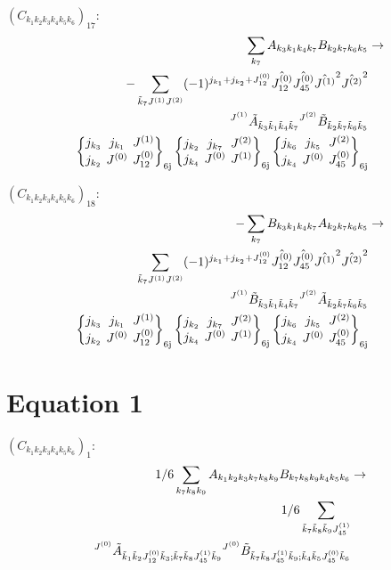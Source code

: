 \documentclass[11pt]{article}
\newcommand{\sixj}[6]{\begingroup\setlength{\arraycolsep}{0.2em}\begin{Bmatrix} #1 & #2 & #3 \\ #4 & #5 & #6 \end{Bmatrix}_{\text{6j}}\endgroup}
\begin{document}
$\left({C}_{{k}_{1}{k}_{2}{k}_{3}{k}_{4}{k}_{5}{k}_{6}}\right)_{17}$:
\begin{align}
\sum_{{k}_{7}}{A}_{{k}_{3}{k}_{1}{k}_{4}{k}_{7}}{B}_{{k}_{2}{k}_{7}{k}_{6}{k}_{5}}&\rightarrow \notag \\-\sum_{\tilde{k}_{7}J^{(1)}J^{(2)}}(-1)^{j_{{k}_{1}} +j_{{k}_{2}} +J^{(0)}_{12} }\hat{J^{(0)}_{12}}\hat{J^{(0)}_{45}}\hat{J^{(1)}}^{2}\hat{J^{(2)}}^{2}& \notag \\{}^{J^{(1)}}\tilde{A}_{\tilde{k}_{3}\tilde{k}_{1}\tilde{k}_{4}\tilde{k}_{7}}{}^{J^{(2)}}\tilde{B}_{\tilde{k}_{2}\tilde{k}_{7}\tilde{k}_{6}\tilde{k}_{5}}& \notag \\\sixj{j_{{k}_{3}}}{j_{{k}_{1}}}{J^{(1)}}{j_{{k}_{2}}}{J^{(0)}}{J^{(0)}_{12}}\sixj{j_{{k}_{2}}}{j_{{k}_{7}}}{J^{(2)}}{j_{{k}_{4}}}{J^{(0)}}{J^{(1)}}\sixj{j_{{k}_{6}}}{j_{{k}_{5}}}{J^{(2)}}{j_{{k}_{4}}}{J^{(0)}}{J^{(0)}_{45}}
\end{align}

$\left({C}_{{k}_{1}{k}_{2}{k}_{3}{k}_{4}{k}_{5}{k}_{6}}\right)_{18}$:
\begin{align}
-\sum_{{k}_{7}}{B}_{{k}_{3}{k}_{1}{k}_{4}{k}_{7}}{A}_{{k}_{2}{k}_{7}{k}_{6}{k}_{5}}&\rightarrow \notag \\\sum_{\tilde{k}_{7}J^{(1)}J^{(2)}}(-1)^{j_{{k}_{1}} +j_{{k}_{2}} +J^{(0)}_{12} }\hat{J^{(0)}_{12}}\hat{J^{(0)}_{45}}\hat{J^{(1)}}^{2}\hat{J^{(2)}}^{2}& \notag \\{}^{J^{(1)}}\tilde{B}_{\tilde{k}_{3}\tilde{k}_{1}\tilde{k}_{4}\tilde{k}_{7}}{}^{J^{(2)}}\tilde{A}_{\tilde{k}_{2}\tilde{k}_{7}\tilde{k}_{6}\tilde{k}_{5}}& \notag \\\sixj{j_{{k}_{3}}}{j_{{k}_{1}}}{J^{(1)}}{j_{{k}_{2}}}{J^{(0)}}{J^{(0)}_{12}}\sixj{j_{{k}_{2}}}{j_{{k}_{7}}}{J^{(2)}}{j_{{k}_{4}}}{J^{(0)}}{J^{(1)}}\sixj{j_{{k}_{6}}}{j_{{k}_{5}}}{J^{(2)}}{j_{{k}_{4}}}{J^{(0)}}{J^{(0)}_{45}}
\end{align}

\section{Equation 1}
$\left({C}_{{k}_{1}{k}_{2}{k}_{3}{k}_{4}{k}_{5}{k}_{6}}\right)_{1}$:
\begin{align}
1/6\sum_{{k}_{7}{k}_{8}{k}_{9}}{A}_{{k}_{1}{k}_{2}{k}_{3}{k}_{7}{k}_{8}{k}_{9}}{B}_{{k}_{7}{k}_{8}{k}_{9}{k}_{4}{k}_{5}{k}_{6}}&\rightarrow \notag \\1/6\sum_{\tilde{k}_{7}\tilde{k}_{8}\tilde{k}_{9}J^{(1)}_{45}}& \notag \\{}^{J^{(0)}}\tilde{A}_{\tilde{k}_{1}\tilde{k}_{2}J^{(0)}_{12}\tilde{k}_{3};\tilde{k}_{7}\tilde{k}_{8}J^{(1)}_{45}\tilde{k}_{9}}{}^{J^{(0)}}\tilde{B}_{\tilde{k}_{7}\tilde{k}_{8}J^{(1)}_{45}\tilde{k}_{9};\tilde{k}_{4}\tilde{k}_{5}J^{(0)}_{45}\tilde{k}_{6}}& \notag \\
\end{align}
\end{document}

